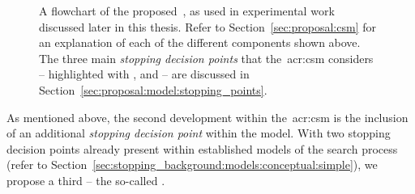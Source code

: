 \begin{figure}[t!]
    \centering
    \caption[The Complex Searcher Model]{A flowchart of the proposed~, as used in experimental work discussed later in this thesis. Refer to Section~\ref{sec:proposal:csm} for an explanation of each of the different components shown above. The three main \emph{stopping decision points} that the~\gls{acr:csm} considers – highlighted with ,  and  – are discussed in Section~\ref{sec:proposal:model:stopping_points}.}
    \label{fig:csm}
\end{figure}

\noindent
{} As mentioned above, the second development within the~\gls{acr:csm} is the inclusion of an additional \emph{stopping decision point} within the model. With two stopping decision points already present within established models of the search process (refer to Section~\ref{sec:stopping_background:models:conceptual:simple}), we propose a third -- the so-called .

